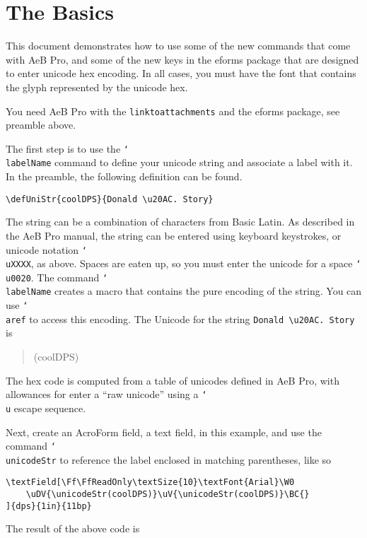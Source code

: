 \documentclass{article}
\newcommand{\cs}[1]{\texttt{\char`\\#1}}
\begin{document}
\makeinlinetitle

\section{The Basics}

This document demonstrates how to use some of the new commands that
come with AeB Pro, and some of the new keys in the eforms package
that are designed to enter unicode hex encoding. In all cases, you must have
the font that contains the glyph represented by the unicode hex.

You need AeB Pro with the \texttt{linktoattachments} and the eforms package, see
preamble above.

The first step is to use the \cs{labelName} command to define your unicode string
and associate a label with it. In the preamble, the following definition can be found.
\begin{verbatim}
\defUniStr{coolDPS}{Donald \u20AC. Story}
\end{verbatim}
The string can be a combination of characters from Basic Latin. As
described in the AeB Pro manual, the string can be entered using
keyboard keystrokes, or unicode notation \cs{uXXXX}, as above.
Spaces are eaten up, so you must enter the unicode for a space
\cs{u0020}. The command \cs{labelName} creates a macro that contains
the pure encoding of the string. You can use \cs{aref} to access
this encoding.
The Unicode for the string \verb!Donald \u20AC. Story! is
\begin{quote}
\unicodeStr(coolDPS)
\end{quote}
The hex code is computed from a table of unicodes defined in AeB Pro, with allowances for enter
a ``raw unicode'' using a \cs{u} escape sequence.

Next, create an AcroForm field, a text field, in this example, and
use the command \cs{unicodeStr} to reference the label enclosed
in matching parentheses, like so
\begin{verbatim}
\textField[\Ff\FfReadOnly\textSize{10}\textFont{Arial}\W0
    \uDV{\unicodeStr(coolDPS)}\uV{\unicodeStr(coolDPS)}\BC{}
]{dps}{1in}{11bp}
\end{verbatim}
The result of the above code is

\end{document}
